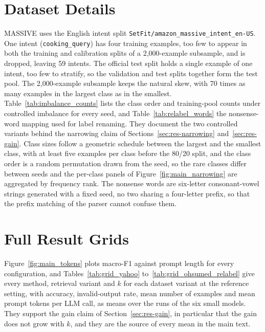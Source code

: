 




\section{Dataset Details}
\label{app:data}

MASSIVE uses the English intent split \texttt{SetFit/amazon\_massive\_intent\_en-US}. One intent (\texttt{cooking\_query}) has four training examples, too few to appear in both the training and calibration splits of a 2,000-example subsample, and is dropped, leaving 59 intents. The official test split holds a single example of one intent, too few to stratify, so the validation and test splits together form the test pool. The 2,000-example subsample keeps the natural skew, with 70 times as many examples in the largest class as in the smallest.
Table~\ref{tab:imbalance_counts} lists the class order and training-pool counts under controlled imbalance for every seed, and Table~\ref{tab:relabel_words} the nonsense-word mapping used for label renaming. They document the two controlled variants behind the narrowing claim of Sections~\ref{sec:res-narrowing} and~\ref{sec:res-gain}. Class sizes follow a geometric schedule between the largest and the smallest class, with at least five examples per class before the 80/20 split, and the class order is a random permutation drawn from the seed, so the rare classes differ between seeds and the per-class panels of Figure~\ref{fig:main_narrowing} are aggregated by frequency rank. The nonsense words are six-letter consonant-vowel strings generated with a fixed seed, no two sharing a four-letter prefix, so that the prefix matching of the parser cannot confuse them.




\section{Full Result Grids}
\label{app:full}

Figure~\ref{fig:main_tokens} plots macro-F1 against prompt length for every configuration, and Tables~\ref{tab:grid_yahoo} to~\ref{tab:grid_ohsumed_relabel} give every method, retrieval variant and $k$ for each dataset variant at the reference setting, with accuracy, invalid-output rate, mean number of examples and mean prompt tokens per LLM call, as means over the runs of the six small models. They support the gain claim of Section~\ref{sec:res-gain}, in particular that the gain does not grow with $k$, and they are the source of every mean in the main text.
















